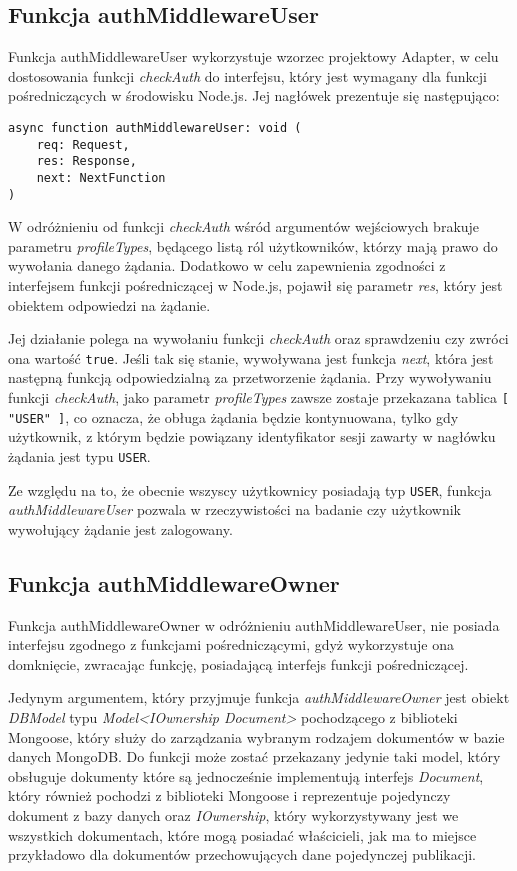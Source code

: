 \documentclass[a4paper,12pt,twoside,openany]{report}
\begin{document}
\subsection{Funkcja authMiddlewareUser}
Funkcja authMiddlewareUser wykorzystuje wzorzec projektowy Adapter, w celu dostosowania funkcji \textit{checkAuth} do interfejsu, który jest wymagany dla funkcji pośredniczących w środowisku Node.js. Jej nagłówek prezentuje się następująco: 

\begin{verbatim}
async function authMiddlewareUser: void (
    req: Request,
    res: Response,
    next: NextFunction
)
\end{verbatim}
W odróżnieniu od funkcji \textit{checkAuth} wśród argumentów wejściowych brakuje parametru \textit{profileTypes}, będącego listą ról użytkowników, którzy mają prawo do wywołania danego żądania. Dodatkowo w celu zapewnienia zgodności z interfejsem funkcji pośredniczącej w Node.js, pojawił się parametr \textit{res}, który jest obiektem odpowiedzi na żądanie.   

Jej działanie polega na wywołaniu funkcji \textit{checkAuth} oraz sprawdzeniu czy zwróci ona wartość \verb|true|. Jeśli tak się stanie, wywoływana jest funkcja \textit{next}, która jest następną funkcją odpowiedzialną za przetworzenie żądania.
Przy wywoływaniu funkcji \textit{checkAuth}, jako parametr \textit{profileTypes}  zawsze zostaje przekazana tablica \verb|[ "USER" ]|, co oznacza, że obługa żądania będzie kontynuowana, tylko gdy użytkownik, z którym będzie powiązany identyfikator sesji zawarty w nagłówku żądania jest typu \verb|USER|. 

Ze względu na to, że obecnie wszyscy użytkownicy posiadają typ \verb|USER|, funkcja \textit{authMiddlewareUser} pozwala w rzeczywistości na badanie czy użytkownik wywołujący żądanie jest zalogowany.

\subsection{Funkcja authMiddlewareOwner}
Funkcja authMiddlewareOwner w odróżnieniu authMiddlewareUser, nie posiada interfejsu zgodnego z funkcjami pośredniczącymi, gdyż wykorzystuje ona domknięcie, zwracając funkcję, posiadającą interfejs funkcji pośredniczącej.


Jedynym argumentem, który przyjmuje funkcja \textit{authMiddlewareOwner} jest obiekt \textit{DBModel} typu \textit{Model<IOwnership  Document>} pochodzącego z biblioteki Mongoose, który służy do zarządzania wybranym rodzajem dokumentów w bazie danych MongoDB. Do funkcji może zostać przekazany jedynie taki model, który obsługuje dokumenty które są jednocześnie implementują interfejs \textit{Document}, który również pochodzi  z biblioteki Mongoose i reprezentuje pojedynczy dokument z bazy danych oraz \textit{IOwnership}, który wykorzystywany jest we wszystkich dokumentach, które mogą posiadać właścicieli, jak ma to miejsce przykładowo dla dokumentów przechowujących dane pojedynczej publikacji. 
\end{document}

